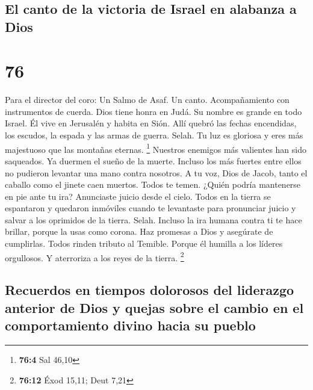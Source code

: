 \hypertarget{el-canto-de-la-victoria-de-israel-en-alabanza-a-dios}{%
\subsection{El canto de la victoria de Israel en alabanza a
Dios}\label{el-canto-de-la-victoria-de-israel-en-alabanza-a-dios}}

\hypertarget{section-75}{%
\section{76}\label{section-75}}

Para el director del coro: Un Salmo de Asaf. Un canto. Acompañamiento
con instrumentos de cuerda.  Dios tiene honra en Judá. Su
nombre es grande en todo Israel.  Él vive en Jerusalén y
habita en Sión.  Allí quebró las fechas encendidas, los
escudos, la espada y las armas de guerra. Selah.  Tu luz es
gloriosa y eres más majestuoso que las montañas eternas. \footnote{\textbf{76:4}
  Sal 46,10}  Nuestros enemigos más valientes han sido
saqueados. Ya duermen el sueño de la muerte. Incluso los más fuertes
entre ellos no pudieron levantar una mano contra nosotros. 
A tu voz, Dios de Jacob, tanto el caballo como el jinete caen muertos.
 Todos te temen. ¿Quién podría mantenerse en pie ante tu
ira?  Anunciaste juicio desde el cielo. Todos en la tierra
se espantaron y quedaron inmóviles  cuando te levantaste
para pronunciar juicio y salvar a los oprimidos de la tierra. Selah.
 Incluso la ira humana contra ti te hace brillar, porque la
usas como corona.  Haz promesas a Dios y asegúrate de
cumplirlas. Todos rinden tributo al Temible.  Porque él
humilla a los líderes orgullosos. Y aterroriza a los reyes de la tierra.
\footnote{\textbf{76:12} Éxod 15,11; Deut 7,21}

\hypertarget{recuerdos-en-tiempos-dolorosos-del-liderazgo-anterior-de-dios-y-quejas-sobre-el-cambio-en-el-comportamiento-divino-hacia-su-pueblo}{%
\subsection{Recuerdos en tiempos dolorosos del liderazgo anterior de
Dios y quejas sobre el cambio en el comportamiento divino hacia su
pueblo}\label{recuerdos-en-tiempos-dolorosos-del-liderazgo-anterior-de-dios-y-quejas-sobre-el-cambio-en-el-comportamiento-divino-hacia-su-pueblo}}

